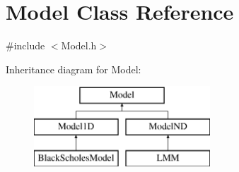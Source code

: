 \hypertarget{class_model}{}\section{Model Class Reference}
\label{class_model}


{\ttfamily \#include $<$Model.\+h$>$}

Inheritance diagram for Model\+:\begin{figure}[H]
\begin{center}
\leavevmode
\includegraphics[height=3.000000cm]{class_model}
\end{center}
\end{figure}
